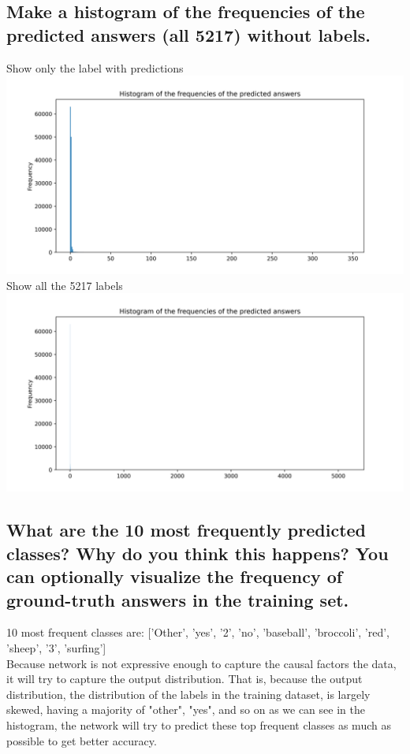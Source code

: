 \documentclass{article}
\begin{document}
\subsection{Make a histogram of the frequencies of the predicted answers (all 5217) without labels.}
Show only the label with predictions \\
\includegraphics[width=\textwidth]{q2.7_1.png}
Show all the 5217 labels \\
\includegraphics[width=\textwidth]{q2.7_2.png}

\subsection{What are the 10 most frequently predicted classes? Why do you think this happens? You can optionally visualize the frequency of ground-truth answers in the training set.}
10 most frequent classes are: ['Other', 'yes', '2', 'no', 'baseball', 'broccoli', 'red', 'sheep', '3', 'surfing'] \\
Because network is not expressive enough to capture the causal factors the data, it will try to capture the output distribution. That is, because the output distribution, the distribution of the labels in the training dataset, is largely skewed, having a majority of "other", "yes", and so on as we can see in the histogram, the network will try to predict these top frequent classes as much as possible to get better accuracy.
\newpage
\end{document}

